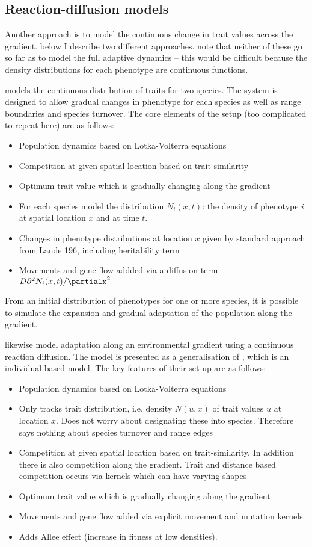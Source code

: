 \documentclass[a4paper,11pt]{article}
\begin{document}
\subsection{Reaction-diffusion models}

Another approach is to model the continuous change in trait values across the gradient. below I describe two different approaches. note that neither of these go so far as to model the full adaptive dynamics --  this would be difficult because the density distributions for each phenotype are continuous functions.

\citet{Case-2000} models the continuous distribution of traits for two species. The system is designed to allow gradual changes in phenotype for each species as well as range boundaries and species turnover.  The core elements of the setup (too complicated to repeat here) are as follows:
\begin{itemize}
  \item Population dynamics based on Lotka-Volterra equations
  \item Competition at given spatial location based on trait-similarity
  \item Optimum trait value which is gradually changing along the gradient
  \item For each species model the distribution $N_i(x,t)$: the density of phenotype $i$ at spatial location $x$ and at time $t$.
  \item Changes in phenotype distributions at location $x$ given by standard approach from Lande 196, including heritability term
  \item Movements and gene flow addded via a diffusion term $D\partial^2 N_i(x,t) /\partialx^2$
\end{itemize}
From an initial distribution of phenotypes for one or more species, it is possible to simulate the expansion and gradual adaptation of the population along the gradient.


\cite{Leimar-2008} likewise model adaptation along an environmental gradient using a continuous reaction diffusion. The model is presented as a generalisation of \citet{Doebeli-2003}, which is an individual based model. The key features of their set-up are as follows:
\begin{itemize}
  \item Population dynamics based on Lotka-Volterra equations
  \item Only tracks trait distribution, i.e. density $N(u,x)$ of trait values $u$ at location $x$. Does not worry about designating these into species. Therefore says nothing about species turnover and range edges
  \item Competition at given spatial location based on trait-similarity. In addition there is also competition along the gradient. Trait and distance based competition occurs via kernels which can have varying shapes
  \item Optimum trait value which is gradually changing along the gradient
  \item Movements and gene flow added via explicit movement and mutation kernels
  \item Adds Allee effect (increase in fitness at low densities).
\end{itemize}


\clearpage



\end{document}

